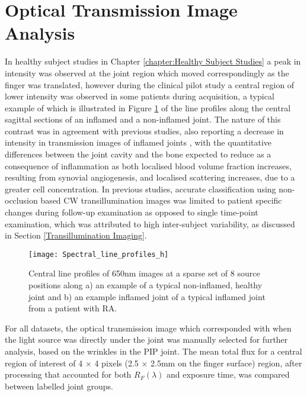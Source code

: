 \documentclass[twoside]{bhamthesis}
\theoremstyle{definition}
\begin{document}
\section{Optical Transmission Image Analysis}
\label{chapter:Optical Transmission Image Analysis}

In healthy subject studies in Chapter \ref{chapter:Healthy Subject Studies} a peak in intensity was observed at the joint region which moved correspondingly as the finger was translated, however during the clinical pilot study a central region of lower intensity was observed in some patients during acquisition, a typical example of which is illustrated in Figure \ref{fig:Spectral_line_profiles_h} of the line profiles along the central sagittal sections of an inflamed and a non-inflamed joint. The nature of this contrast was in agreement with previous studies, also reporting a decrease in intensity in transmission images of inflamed joints \cite{hielscher2003assessment}, with the quantitative differences between the joint cavity and the bone expected to reduce as a consequence of inflammation as both localised blood volume fraction increases, resulting from synovial angiogenesis, and localised scattering increases, due to a greater cell concentration. In previous studies, accurate classification using non-occlusion based CW transillumination images was limited to patient specific changes during follow-up examination as opposed to single time-point examination, which was attributed to high inter-subject variability, as discussed in Section \ref{Transillumination Imaging}. 

\begin{figure}[!ht]
\centering\texttt{[image: Spectral\_line\_profiles\_h]}\caption{Central line profiles of 650nm images at a sparse set of 8 source positions along a) an example of a typical non-inflamed, healthy joint and b) an example inflamed joint of a typical inflamed joint from a patient with RA.}
\label{fig:Spectral_line_profiles_h}
\end{figure}

For all datasets, the optical transmission image which corresponded with when the light source was directly under the joint was manually selected for further analysis, based on the wrinkles in the PIP joint. The mean total flux for a central region of interest of 4 $\times$ 4 pixels (2.5 $\times$ 2.5mm on the finger surface) region, after processing that accounted for both $R_F(\lambda)$ and exposure time, was compared between labelled joint groups. 
\end{document}
